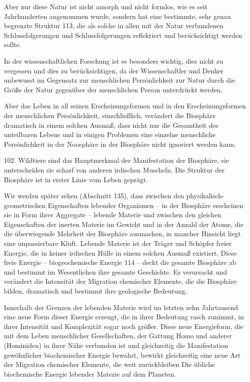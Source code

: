 \documentclass[11pt,a4paper]{book}
\begin{document}
Aber nur diese Natur ist nicht amorph und nicht formlos, wie es seit Jahrhunderten angenommen wurde, sondern hat eine bestimmte, sehr genau begrenzte Struktur 113, die als solche in allen mit der Natur verbundenen Schlussfolgerungen und Schlussfolgerungen reflektiert und berücksichtigt werden sollte.



In der wissenschaftlichen Forschung ist es besonders wichtig, dies nicht zu vergessen und dies zu berücksichtigen, da der Wissenschaftler und Denker unbewusst im Gegensatz zur menschlichen Persönlichkeit zur Natur durch die Größe der Natur gegenüber der menschlichen Person unterdrückt werden.



Aber das Leben in all seinen Erscheinungsformen und in den Erscheinungsformen der menschlichen Persönlichkeit, einschließlich, verändert die Biosphäre dramatisch in einem solchen Ausmaß, dass nicht nur die Gesamtheit des unteilbaren Lebens und in einigen Problemen eine einzelne menschliche Persönlichkeit in der Noosphäre in der Biosphäre nicht ignoriert werden kann.



102. Wildtiere sind das Hauptmerkmal der Manifestation der Biosphäre, sie unterscheiden sie scharf von anderen irdischen Muscheln. Die Struktur der Biosphäre ist in erster Linie vom Leben geprägt.



Wir werden später sehen (Abschnitt 135), dass zwischen den physikalisch-geometrischen Eigenschaften lebender Organismen -- in der Biosphäre erscheinen sie in Form ihrer Aggregate -- lebende Materie und zwischen den gleichen Eigenschaften der inerten Materie im Gewicht und in der Anzahl der Atome, die die überwiegende Mehrheit der Biosphäre ausmachen, in mancher Hinsicht liegt eine unpassierbare Kluft. Lebende Materie ist der Träger und Schöpfer freier Energie, die in keiner irdischen Hülle in einem solchen Ausmaß existiert. Diese freie Energie -- biogeochemische Energie 114 -- deckt die gesamte Biosphäre ab und bestimmt im Wesentlichen ihre gesamte Geschichte. Es verursacht und verändert die Intensität der Migration chemischer Elemente, die die Biosphäre bilden, dramatisch und bestimmt ihre geologische Bedeutung.



Innerhalb der Grenzen der lebenden Materie wird im letzten zehn Jahrtausend eine neue Form dieser Energie erzeugt, die in ihrer Bedeutung rasch zunimmt, in ihrer Intensität und Komplexität sogar noch größer. Diese neue Energieform, die mit dem Leben menschlicher Gesellschaften, der Gattung Homo und anderer (Hominiden) in ihrer Nähe verbunden ist und gleichzeitig die Manifestation gewöhnlicher biochemischer Energie bewahrt, bewirkt gleichzeitig eine neue Art der Migration chemischer Elemente, die weit zurückbleiben Die übliche biochemische Energie lebender Materie auf dem Planeten.
\end{document}
